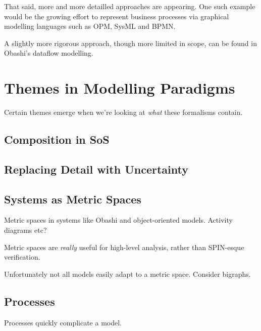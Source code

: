 That said, more and more detailled approaches are appearing. One such example would be the growing effort to represent business processes via graphical modelling languages such as OPM, SysML and BPMN.
\par

A slightly more rigorous approach, though more limited in scope, can be found in Obashi's dataflow modelling.
\par


\section{Themes in Modelling Paradigms}
Certain themes emerge when we're looking at \emph{what} these formalisms contain.


\subsection{Composition in SoS}


\subsection{Replacing Detail with Uncertainty}


\subsection{Systems as Metric Spaces}
Metric spaces in systems like Obashi and object-oriented models. Activity diagrams etc?
\par

Metric spaces are \emph{really} useful for high-level analysis, rather than SPIN-esque verification.
\par

Unfortunately not all models easily adapt to a metric space. Consider bigraphs.
\par

\subsection{Processes}
Processes quickly complicate a model.


